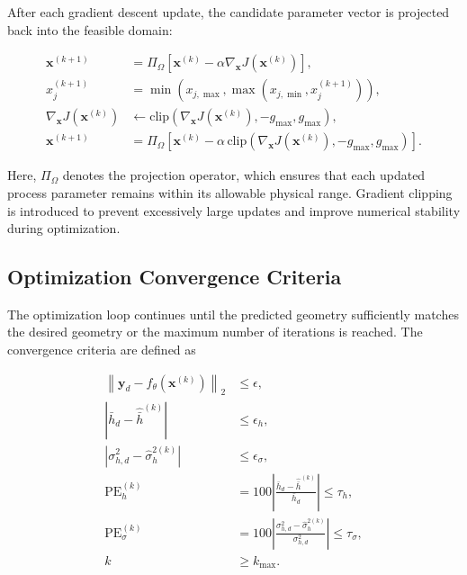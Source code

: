 \documentclass[11pt]{article}
\begin{document}
After each gradient descent update, the candidate parameter vector is projected back into the feasible domain:

\begin{tcolorbox}[colback=white,colframe=black,boxrule=0.5pt,arc=2pt]
\small
\begin{equation}
\begin{aligned}
\mathbf{x}^{(k+1)}
&=
\Pi_{\Omega}
\left[
\mathbf{x}^{(k)}
-
\alpha
\nabla_{\mathbf{x}}J(\mathbf{x}^{(k)})
\right], \\[4pt]
x_j^{(k+1)}
&=
\min\left(
x_{j,\max},
\max\left(
x_{j,\min},
x_j^{(k+1)}
\right)
\right), \\[4pt]
\nabla_{\mathbf{x}}J(\mathbf{x}^{(k)})
&\leftarrow
\mathrm{clip}
\left(
\nabla_{\mathbf{x}}J(\mathbf{x}^{(k)}),
-g_{\max},
g_{\max}
\right), \\[4pt]
\mathbf{x}^{(k+1)}
&=
\Pi_{\Omega}
\left[
\mathbf{x}^{(k)}
-
\alpha\,
\mathrm{clip}
\left(
\nabla_{\mathbf{x}}J(\mathbf{x}^{(k)}),
-g_{\max},
g_{\max}
\right)
\right].
\end{aligned}
\end{equation}
\end{tcolorbox}

Here, $\Pi_{\Omega}$ denotes the projection operator, which ensures that each updated process parameter remains within its allowable physical range. Gradient clipping is introduced to prevent excessively large updates and improve numerical stability during optimization.

\subsection{Optimization Convergence Criteria}

The optimization loop continues until the predicted geometry sufficiently matches the desired geometry or the maximum number of iterations is reached. The convergence criteria are defined as

\begin{tcolorbox}[colback=white,colframe=black,boxrule=0.5pt,arc=2pt]
\small
\begin{equation}
\begin{aligned}
\left\|
\mathbf{y}_{d}
-
f_{\theta}\left(\mathbf{x}^{(k)}\right)
\right\|_{2}
&\leq \epsilon, \\[4pt]
\left|
\bar{h}_{d}
-
\hat{\bar{h}}^{(k)}
\right|
&\leq \epsilon_{h}, \\[4pt]
\left|
\sigma_{h,d}^{2}
-
\hat{\sigma}_{h}^{2(k)}
\right|
&\leq \epsilon_{\sigma}, \\[4pt]
\mathrm{PE}_{h}^{(k)}
&=
100
\left|
\frac{
\bar{h}_{d}
-
\hat{\bar{h}}^{(k)}
}{
\bar{h}_{d}
}
\right|
\leq
\tau_h, \\[4pt]
\mathrm{PE}_{\sigma}^{(k)}
&=
100
\left|
\frac{
\sigma_{h,d}^{2}
-
\hat{\sigma}_{h}^{2(k)}
}{
\sigma_{h,d}^{2}
}
\right|
\leq
\tau_{\sigma}, \\[4pt]
k &\geq k_{\max}.
\end{aligned}
\end{equation}
\end{tcolorbox}
\end{document}
